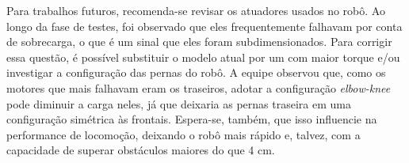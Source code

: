 \documentclass[../main.tex]{subfiles}
\begin{document}
  Para trabalhos futuros, recomenda-se revisar os atuadores usados no robô. Ao longo da fase de testes, foi observado que eles frequentemente falhavam por conta de sobrecarga, o que é um sinal que eles foram subdimensionados. Para corrigir essa questão, é possível substituir o modelo atual por um com maior torque e/ou investigar a configuração das pernas do robô. A equipe observou que, como os motores que mais falhavam eram os traseiros, adotar a configuração \textit{elbow-knee} pode diminuir a carga neles, já que deixaria as pernas traseira em uma configuração simétrica às frontais. Espera-se, também, que isso influencie na performance de locomoção, deixando o robô mais rápido e, talvez, com a capacidade de superar obstáculos maiores do que 4 cm.  
\end{document}

